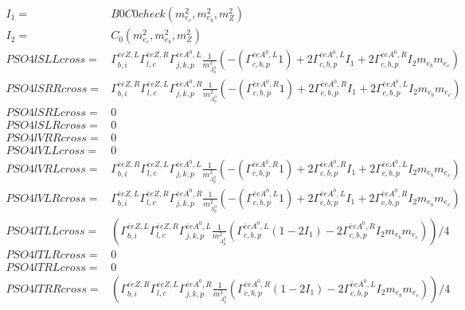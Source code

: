 \documentclass[A4,landscape]{article}
\begin{document}
\begin{align} 
I_1= & B0C0check(m^2_{e_{{c}}}, m^2_{e_{{b}}}, m^2_{Z}) \\ 
I_2= & C_0(m^2_{e_{{c}}}, m^2_{e_{{b}}}, m^2_{Z}) \\ 
  PSO4lSLLcross= &  \Gamma^{\bar{e}e Z ,L}_{b, i} \Gamma^{\bar{e}e Z ,R}_{l, c} \Gamma^{\bar{e}e A^0 ,L}_{j, k, p} \frac{1}{m^2_{A^0_{{p}}}} (-(\Gamma^{\bar{e}e A^0 ,L}_{c, b, p} 1) + 2 \Gamma^{\bar{e}e A^0 ,L}_{c, b, p} I_1 + 2 \Gamma^{\bar{e}e A^0 ,R}_{c, b, p} I_2 m_{e_{{b}}} m_{e_{{c}}}) \\ 
  PSO4lSRRcross= &  \Gamma^{\bar{e}e Z ,R}_{b, i} \Gamma^{\bar{e}e Z ,L}_{l, c} \Gamma^{\bar{e}e A^0 ,R}_{j, k, p} \frac{1}{m^2_{A^0_{{p}}}} (-(\Gamma^{\bar{e}e A^0 ,R}_{c, b, p} 1) + 2 \Gamma^{\bar{e}e A^0 ,R}_{c, b, p} I_1 + 2 \Gamma^{\bar{e}e A^0 ,L}_{c, b, p} I_2 m_{e_{{b}}} m_{e_{{c}}}) \\ 
  PSO4lSRLcross= & 0 \\ 
  PSO4lSLRcross= & 0 \\ 
  PSO4lVRRcross= & 0 \\ 
  PSO4lVLLcross= & 0 \\ 
  PSO4lVRLcross= &  \Gamma^{\bar{e}e Z ,R}_{b, i} \Gamma^{\bar{e}e Z ,L}_{l, c} \Gamma^{\bar{e}e A^0 ,L}_{j, k, p} \frac{1}{m^2_{A^0_{{p}}}} (-(\Gamma^{\bar{e}e A^0 ,R}_{c, b, p} 1) + 2 \Gamma^{\bar{e}e A^0 ,R}_{c, b, p} I_1 + 2 \Gamma^{\bar{e}e A^0 ,L}_{c, b, p} I_2 m_{e_{{b}}} m_{e_{{c}}}) \\ 
  PSO4lVLRcross= &  \Gamma^{\bar{e}e Z ,L}_{b, i} \Gamma^{\bar{e}e Z ,R}_{l, c} \Gamma^{\bar{e}e A^0 ,R}_{j, k, p} \frac{1}{m^2_{A^0_{{p}}}} (-(\Gamma^{\bar{e}e A^0 ,L}_{c, b, p} 1) + 2 \Gamma^{\bar{e}e A^0 ,L}_{c, b, p} I_1 + 2 \Gamma^{\bar{e}e A^0 ,R}_{c, b, p} I_2 m_{e_{{b}}} m_{e_{{c}}}) \\ 
  PSO4lTLLcross= & ( \Gamma^{\bar{e}e Z ,L}_{b, i} \Gamma^{\bar{e}e Z ,R}_{l, c} \Gamma^{\bar{e}e A^0 ,L}_{j, k, p} \frac{1}{m^2_{A^0_{{p}}}} (\Gamma^{\bar{e}e A^0 ,L}_{c, b, p} (1 - 2 I_1) - 2 \Gamma^{\bar{e}e A^0 ,R}_{c, b, p} I_2 m_{e_{{b}}} m_{e_{{c}}}))/4 \\ 
  PSO4lTLRcross= & 0 \\ 
  PSO4lTRLcross= & 0 \\ 
  PSO4lTRRcross= & ( \Gamma^{\bar{e}e Z ,R}_{b, i} \Gamma^{\bar{e}e Z ,L}_{l, c} \Gamma^{\bar{e}e A^0 ,R}_{j, k, p} \frac{1}{m^2_{A^0_{{p}}}} (\Gamma^{\bar{e}e A^0 ,R}_{c, b, p} (1 - 2 I_1) - 2 \Gamma^{\bar{e}e A^0 ,L}_{c, b, p} I_2 m_{e_{{b}}} m_{e_{{c}}}))/4 \\ 
\end{align} 
\end{document}

